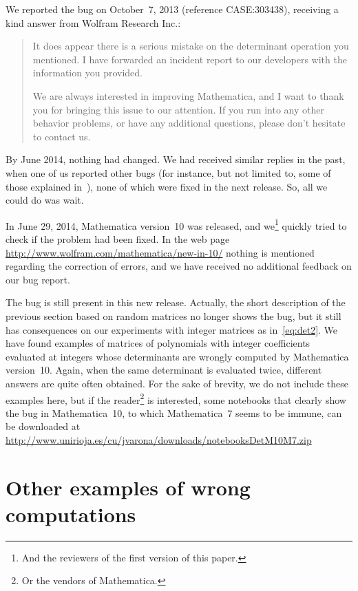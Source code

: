 \documentclass[12pt]{article}
\begin{document}
We reported the bug on October~7, 2013 (reference CASE:303438), receiving a kind answer from Wolfram Research Inc.:
\begin{quote}
%
%
It does appear there is a serious mistake on the determinant operation you mentioned. I have forwarded an incident report to our developers with the information you provided.

We are always interested in improving Mathematica, and I want to thank you for bringing this issue to our attention. If you run into any other behavior problems, or have any additional questions, please don't hesitate to contact us.
\end{quote} 

By June 2014, nothing had changed. We had received similar replies in the past, when one of us reported other bugs (for instance, but not limited to, some of those explained in~\cite{CV}), none of which were fixed in the next release. So, all we could do was wait.

In June 29, 2014, Mathematica version~10 was released, and we\footnote{And the reviewers of the first version of this paper.} quickly tried to check if the problem had been fixed. In the web page \url{http://www.wolfram.com/mathematica/new-in-10/} nothing is mentioned regarding the correction of errors, and we have received no additional feedback on our bug report.

The bug is still present in this new release. Actually, the short description of the previous section based on random matrices no longer shows the bug, but it still has consequences on our experiments with integer matrices as in~\eqref{eq:det2}. We have  found examples of matrices of polynomials with integer coefficients evaluated at integers whose determinants are wrongly computed by Mathematica version~10. Again, when the same determinant is evaluated twice, different answers are quite often obtained. 
For the sake of brevity, we do not include these examples here, but if the reader\footnote{Or the vendors of Mathematica.} is interested, some notebooks that clearly show the bug in Mathematica~10, to which Mathematica~7 seems to be immune, can be downloaded at \url{http://www.unirioja.es/cu/jvarona/downloads/notebooksDetM10M7.zip}

\section*{Other examples of wrong computations}
\end{document}
